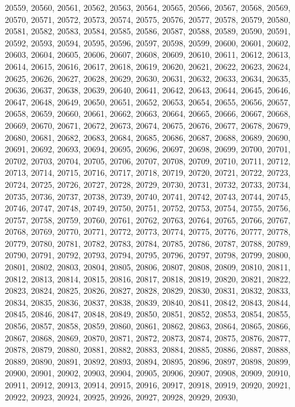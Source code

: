 20559,
20560,
20561,
20562,
20563,
20564,
20565,
20566,
20567,
20568,
20569,
20570,
20571,
20572,
20573,
20574,
20575,
20576,
20577,
20578,
20579,
20580,
20581,
20582,
20583,
20584,
20585,
20586,
20587,
20588,
20589,
20590,
20591,
20592,
20593,
20594,
20595,
20596,
20597,
20598,
20599,
20600,
20601,
20602,
20603,
20604,
20605,
20606,
20607,
20608,
20609,
20610,
20611,
20612,
20613,
20614,
20615,
20616,
20617,
20618,
20619,
20620,
20621,
20622,
20623,
20624,
20625,
20626,
20627,
20628,
20629,
20630,
20631,
20632,
20633,
20634,
20635,
20636,
20637,
20638,
20639,
20640,
20641,
20642,
20643,
20644,
20645,
20646,
20647,
20648,
20649,
20650,
20651,
20652,
20653,
20654,
20655,
20656,
20657,
20658,
20659,
20660,
20661,
20662,
20663,
20664,
20665,
20666,
20667,
20668,
20669,
20670,
20671,
20672,
20673,
20674,
20675,
20676,
20677,
20678,
20679,
20680,
20681,
20682,
20683,
20684,
20685,
20686,
20687,
20688,
20689,
20690,
20691,
20692,
20693,
20694,
20695,
20696,
20697,
20698,
20699,
20700,
20701,
20702,
20703,
20704,
20705,
20706,
20707,
20708,
20709,
20710,
20711,
20712,
20713,
20714,
20715,
20716,
20717,
20718,
20719,
20720,
20721,
20722,
20723,
20724,
20725,
20726,
20727,
20728,
20729,
20730,
20731,
20732,
20733,
20734,
20735,
20736,
20737,
20738,
20739,
20740,
20741,
20742,
20743,
20744,
20745,
20746,
20747,
20748,
20749,
20750,
20751,
20752,
20753,
20754,
20755,
20756,
20757,
20758,
20759,
20760,
20761,
20762,
20763,
20764,
20765,
20766,
20767,
20768,
20769,
20770,
20771,
20772,
20773,
20774,
20775,
20776,
20777,
20778,
20779,
20780,
20781,
20782,
20783,
20784,
20785,
20786,
20787,
20788,
20789,
20790,
20791,
20792,
20793,
20794,
20795,
20796,
20797,
20798,
20799,
20800,
20801,
20802,
20803,
20804,
20805,
20806,
20807,
20808,
20809,
20810,
20811,
20812,
20813,
20814,
20815,
20816,
20817,
20818,
20819,
20820,
20821,
20822,
20823,
20824,
20825,
20826,
20827,
20828,
20829,
20830,
20831,
20832,
20833,
20834,
20835,
20836,
20837,
20838,
20839,
20840,
20841,
20842,
20843,
20844,
20845,
20846,
20847,
20848,
20849,
20850,
20851,
20852,
20853,
20854,
20855,
20856,
20857,
20858,
20859,
20860,
20861,
20862,
20863,
20864,
20865,
20866,
20867,
20868,
20869,
20870,
20871,
20872,
20873,
20874,
20875,
20876,
20877,
20878,
20879,
20880,
20881,
20882,
20883,
20884,
20885,
20886,
20887,
20888,
20889,
20890,
20891,
20892,
20893,
20894,
20895,
20896,
20897,
20898,
20899,
20900,
20901,
20902,
20903,
20904,
20905,
20906,
20907,
20908,
20909,
20910,
20911,
20912,
20913,
20914,
20915,
20916,
20917,
20918,
20919,
20920,
20921,
20922,
20923,
20924,
20925,
20926,
20927,
20928,
20929,
20930,
